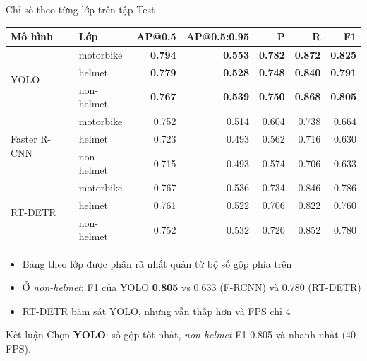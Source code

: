 \begin{frame}{Chỉ số theo từng lớp trên tập Test}

\begin{table}
\scriptsize
\begin{tabular}{llrrrrr}
  \toprule
  \textbf{Mô hình} & \textbf{Lớp} & \textbf{AP@0.5} & \textbf{AP@0.5:0.95} & \textbf{P} & \textbf{R} & \textbf{F1} \\
  \midrule
  \multirow{3}{*}{YOLO}
    & motorbike  & \textbf{0.794} & \textbf{0.553} & \textbf{0.782} & \textbf{0.872} & \textbf{0.825} \\
    & helmet     & \textbf{0.779} & \textbf{0.528} & \textbf{0.748} & \textbf{0.840} & \textbf{0.791} \\
    & non-helmet & \textbf{0.767} & \textbf{0.539} & \textbf{0.750} & \textbf{0.868} & \textbf{0.805} \\
  \midrule
  \multirow{3}{*}{Faster R-CNN}
    & motorbike  & 0.752 & 0.514 & 0.604 & 0.738 & 0.664 \\
    & helmet     & 0.723 & 0.493 & 0.562 & 0.716 & 0.630 \\
    & non-helmet & 0.715 & 0.493 & 0.574 & 0.706 & 0.633 \\
  \midrule
  \multirow{3}{*}{RT-DETR}
    & motorbike  & 0.767 & 0.536 & 0.734 & 0.846 & 0.786 \\
    & helmet     & 0.761 & 0.522 & 0.706 & 0.822 & 0.760 \\
    & non-helmet & 0.752 & 0.532 & 0.720 & 0.852 & 0.780 \\
  \bottomrule
\end{tabular}
\end{table}

\vspace{0.2em}
\begin{itemize}\scriptsize
  \item Bảng theo lớp được phân rã nhất quán từ bộ số gộp phía trên
  \item Ở \textit{non-helmet}: F1 của YOLO \textbf{0.805} vs 0.633 (F-RCNN) và 0.780 (RT-DETR)
  \item RT-DETR bám sát YOLO, nhưng vẫn thấp hơn và FPS chỉ 4
\end{itemize}

\vspace{0.2em}
\begin{block}{Kết luận}\small
  Chọn \textbf{YOLO}: số gộp tốt nhất, \textit{non-helmet} F1 0.805 và nhanh nhất (40 FPS).
\end{block}

\end{frame}

